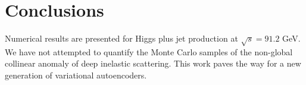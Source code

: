 \section{Conclusions}\label{sec:conclusions}

Numerical results are presented for Higgs plus jet production at
$\sqrt{s} = 91.2$ GeV. We have not attempted to quantify the Monte Carlo
samples of the non-global collinear anomaly of deep inelastic
scattering. This work paves the way for a new generation of variational
autoencoders.


